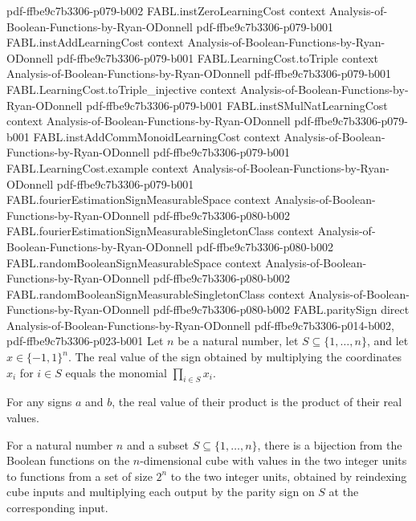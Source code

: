 \begin{theorem}
{    pdf-ffbe9c7b3306-p079-b002}
\proofstep
  {FABL.instZeroLearningCost}
  {context}
  {Analysis-of-Boolean-Functions-by-Ryan-ODonnell}
  {pdf-ffbe9c7b3306-p079-b001}
\proofstep
  {FABL.instAddLearningCost}
  {context}
  {Analysis-of-Boolean-Functions-by-Ryan-ODonnell}
  {pdf-ffbe9c7b3306-p079-b001}
\proofstep
  {FABL.LearningCost.toTriple}
  {context}
  {Analysis-of-Boolean-Functions-by-Ryan-ODonnell}
  {pdf-ffbe9c7b3306-p079-b001}
\proofstep
  {FABL.LearningCost.toTriple_injective}
  {context}
  {Analysis-of-Boolean-Functions-by-Ryan-ODonnell}
  {pdf-ffbe9c7b3306-p079-b001}
\proofstep
  {FABL.instSMulNatLearningCost}
  {context}
  {Analysis-of-Boolean-Functions-by-Ryan-ODonnell}
  {pdf-ffbe9c7b3306-p079-b001}
\proofstep
  {FABL.instAddCommMonoidLearningCost}
  {context}
  {Analysis-of-Boolean-Functions-by-Ryan-ODonnell}
  {pdf-ffbe9c7b3306-p079-b001}
\proofstep
  {FABL.LearningCost.example}
  {context}
  {Analysis-of-Boolean-Functions-by-Ryan-ODonnell}
  {pdf-ffbe9c7b3306-p079-b001}
\proofstep
  {FABL.fourierEstimationSignMeasurableSpace}
  {context}
  {Analysis-of-Boolean-Functions-by-Ryan-ODonnell}
  {pdf-ffbe9c7b3306-p080-b002}
\proofstep
  {FABL.fourierEstimationSignMeasurableSingletonClass}
  {context}
  {Analysis-of-Boolean-Functions-by-Ryan-ODonnell}
  {pdf-ffbe9c7b3306-p080-b002}
\proofstep
  {FABL.randomBooleanSignMeasurableSpace}
  {context}
  {Analysis-of-Boolean-Functions-by-Ryan-ODonnell}
  {pdf-ffbe9c7b3306-p080-b002}
\proofstep
  {FABL.randomBooleanSignMeasurableSingletonClass}
  {context}
  {Analysis-of-Boolean-Functions-by-Ryan-ODonnell}
  {pdf-ffbe9c7b3306-p080-b002}
\proofstep
  {FABL.paritySign}
  {direct}
  {Analysis-of-Boolean-Functions-by-Ryan-ODonnell}
  {pdf-ffbe9c7b3306-p014-b002,
    pdf-ffbe9c7b3306-p023-b001}
Let $n$ be a natural number, let $S\subseteq\{1,\ldots,n\}$, and let $x\in\{-1,1\}^n$.
The real value of the sign obtained by multiplying the coordinates $x_i$ for $i\in S$
equals the monomial $\prod_{i\in S}x_i$.
\end{theorem}

\begin{theorem}
\label{FABL.signValue_mul}
\leanok
{}
For any signs $a$ and $b$, the real value of their product is the product of their real
values.
\end{theorem}

\begin{definition}
\label{FABL.randomBooleanCoefficientSampleEquiv}
\leanok
{}
For a natural number $n$ and a subset $S\subseteq\{1,\ldots,n\}$, there is a bijection
from the Boolean functions on the $n$-dimensional cube with values in the two integer
units to functions from a set of size $2^n$ to the two integer units, obtained by
reindexing cube inputs and multiplying each output by the parity sign on $S$ at the
corresponding input.
\end{definition}

